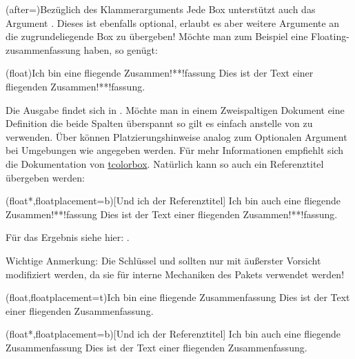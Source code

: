 \documentclass[ngerman]{article}
\def\env#1{\texttt{\paletteB{#1}}}
\def\arg#1{\textit{\paletteB{#1}}}
\begin{document}
\begin{bemerkung*}(after=\bigskip){Bezüglich des Klammerarguments}
    \label{bem:optbracekey}Jede Box unterstützt auch das Argument \arg{Boxargs}. Dieses ist ebenfalls optional, erlaubt es aber weitere Argumente an die zugrundeliegende Box zu übergeben!
    Möchte man zum Beispiel eine Floating-zusammenfassung haben, so genügt:
\begin{latex}
\begin{zusammenfassung}(float){Ich bin eine fliegende Zusammen!**!fassung}
    Dies ist der Text einer fliegenden Zusammen!**!fassung.
\end{zusammenfassung}
\end{latex}
    Die Ausgabe findet sich in . Möchte man in einem Zweispaltigen Dokument eine Definition die beide Spalten überspannt so gilt es einfach  anstelle von  zu verwenden. Über  können Platzierungshinweise analog zum Optionalen Argument bei Umgebungen wie \env{figure} angegeben werden. Für mehr Informationen empfiehlt sich die Dokumentation von \href{https://www.ctan.org/pkg/tcolorbox}{tcolorbox}.
    Natürlich kann so auch ein Referenztitel übergeben werden:
\begin{latex}
\begin{zusammenfassung}(float*,floatplacement=b)[Und ich der Referenztitel]
            {Ich bin auch eine fliegende Zusammen!**!fassung}
    Dies ist der Text einer fliegenden Zusammen!**!fassung.
\end{zusammenfassung}
\end{latex}
Für das Ergebnis siehe hier: .

Wichtige Anmerkung: Die Schlüssel  und  sollten nur mit äußerster Vorsicht modifiziert werden, da sie für interne Mechaniken des Pakets verwendet werden!
\end{bemerkung*}

\begin{zusammenfassung}(float,floatplacement=t){Ich bin eine fliegende Zusammenfassung}
    \label{zsf:floatingex}Dies ist der Text einer fliegenden Zusammenfassung.
\end{zusammenfassung}

\begin{zusammenfassung}(float*,floatplacement=b)[Und ich der Referenztitel]
            {Ich bin auch eine fliegende Zusammenfassung}
    \label{zsf:floatingex2}Dies ist der Text einer fliegenden Zusammenfassung.
\end{zusammenfassung}
\end{document}

